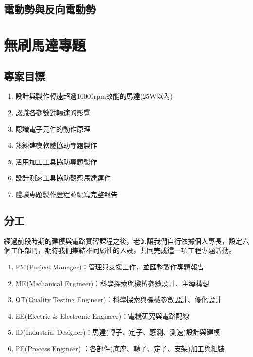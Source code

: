 \documentclass[12pt,a4paper]{article}
\begin{document}
\begin{CJK*}{UTF8}{bkai}
    \subsection{電動勢與反向電動勢}

    \newpage

    \section{無刷馬達專題}

    \subsection{專案目標}
    \label{sec:goal}
    \begin{enumerate}
        \item 設計與製作轉速超過10000rpm效能的馬達(25W以內)
        \item 認識各參數對轉速的影響
        \item 認識電子元件的動作原理
        \item 熟練建模軟體協助專題製作
        \item 活用加工工具協助專題製作
        \item 設計測速工具協助觀察馬達運作
        \item 體驗專題製作歷程並編寫完整報告
    \end{enumerate}

    \subsection{分工}
    經過前段時期的建模與電路實習課程之後，老師讓我們自行依據個人專長，設定六個工作部門，期待我們集結不同屬性的人設，共同完成這一項工程專題活動。
    \begin{enumerate}
        \item PM(Project Manager)：管理與支援工作，並匯整製作專題報告
        \item ME(Mechanical Engineer)：科學探索與機械參數設計、主導構想
        \item QT(Quality Testing Engineer)：科學探索與機械參數設計、優化設計
        \item EE(Electric \& Electronic Engineer)：電機研究與電路配線
        \item ID(Industrial Designer)：馬達(轉子、定子、感測、測速)設計與建模
        \item PE(Process Engineer) ：各部件(底座、轉子、定子、支架)加工與組裝
    \end{enumerate}


\end{CJK*}
\end{document}
